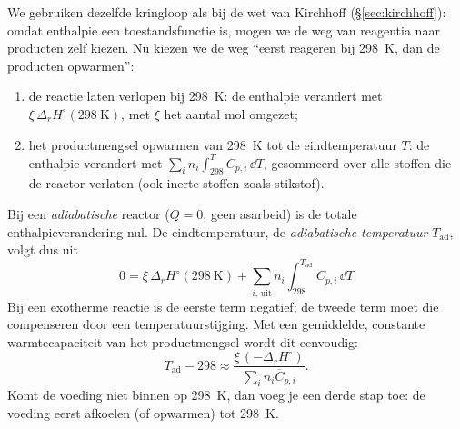 We gebruiken dezelfde kringloop als bij de wet van Kirchhoff (\S\ref{sec:kirchhoff}): omdat enthalpie een toestandsfunctie is, mogen we de weg van reagentia naar producten zelf kiezen. Nu kiezen we de weg ``eerst reageren bij \SI{298}{\kelvin}, dan de producten opwarmen'':
\begin{enumerate}
\item de reactie laten verlopen bij \SI{298}{\kelvin}: de enthalpie verandert met $\xi\,\Delta_r H^\circ(\SI{298}{\kelvin})$, met $\xi$ het aantal mol omgezet;
\item het productmengsel opwarmen van \SI{298}{\kelvin} tot de eindtemperatuur $T$: de enthalpie verandert met $\sum_i n_i \int_{298}^{T} C_{p,i}\,\dd T$, gesommeerd over alle stoffen die de reactor verlaten (ook inerte stoffen zoals stikstof).
\end{enumerate}
Bij een \emph{adiabatische} reactor ($Q = 0$, geen asarbeid) is de totale enthalpieverandering nul. De eindtemperatuur, de \emph{adiabatische temperatuur} $T_\mathrm{ad}$, volgt dus uit
\begin{equation}
\boxed{\;0 = \xi\,\Delta_r H^\circ(\SI{298}{\kelvin}) + \sum_{i,\,\mathrm{uit}} n_i \int_{298}^{T_\mathrm{ad}} C_{p,i}\,\dd T\;}
\label{eq:adiabatische-temperatuur}
\end{equation}
Bij een exotherme reactie is de eerste term negatief; de tweede term moet die compenseren door een temperatuurstijging. Met een gemiddelde, constante warmtecapaciteit van het productmengsel wordt dit eenvoudig:
\begin{equation}
T_\mathrm{ad} - 298 \approx \frac{\xi\,(-\Delta_r H^\circ)}{\sum_i n_i \overline{C}_{p,i}}.
\label{eq:adiabatische-temperatuur-cp}
\end{equation}
Komt de voeding niet binnen op \SI{298}{\kelvin}, dan voeg je een derde stap toe: de voeding eerst afkoelen (of opwarmen) tot \SI{298}{\kelvin}.

